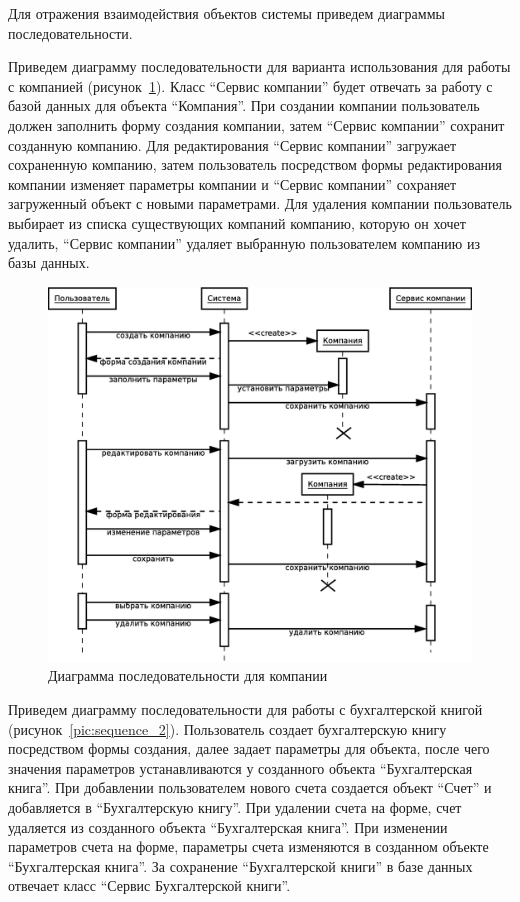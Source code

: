 \documentclass[14pt,a4paper]{reportmod}
\begin{document}
Для отражения взаимодействия объектов системы приведем диаграммы последовательности.

Приведем диаграмму последовательности для варианта использования для работы с компанией (рисунок~\ref{pic:sequence_1}).  Класс ``Сервис компании'' будет отвечать за работу с базой данных для объекта ``Компания''. При создании компании пользователь должен заполнить форму создания компании, затем ``Сервис компании'' сохранит созданную компанию. Для редактирования ``Сервис компании'' загружает сохраненную компанию, затем пользователь посредством формы редактирования компании изменяет параметры компании и ``Сервис компании'' сохраняет загруженный объект с новыми параметрами. Для удаления компании пользователь выбирает из списка существующих компаний компанию, которую он хочет удалить, ``Сервис компании'' удаляет выбранную пользователем компанию из базы данных.

\begin{figure}
  \centering
  \includegraphics[scale=0.4]{uml/_sequence_4}
  \caption{Диаграмма последовательности для компании}
  \label{pic:sequence_1}
\end{figure}

Приведем диаграмму последовательности для работы с бухгалтерской книгой (рисунок~\ref{pic:sequence_2}). Пользователь создает бухгалтерскую книгу посредством формы создания, далее задает параметры для объекта, после чего значения параметров устанавливаются у созданного объекта ``Бухгалтерская книга''. При добавлении пользователем нового счета создается объект ``Счет'' и добавляется в ``Бухгалтерскую книгу''. При удалении счета на форме, счет удаляется из созданного объекта ``Бухгалтерская книга''. При изменении параметров счета на форме, параметры счета изменяются в созданном объекте ``Бухгалтерская книга''. За сохранение ``Бухгалтерской книги'' в базе данных отвечает класс ``Сервис Бухгалтерской книги''.
\end{document}
